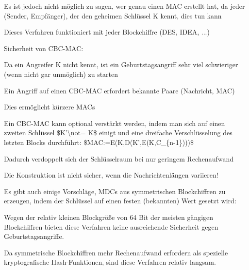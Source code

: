 \documentclass[a4paper]{article}
\begin{document}
\begin{multicols}{3}
\begin{itemize*}
            \begin{itemize*}
                  \item Es ist jedoch nicht möglich zu sagen, wer genau einen MAC erstellt hat, da jeder (Sender, Empfänger), der den geheimen Schlüssel K kennt, dies tun kann
            \end{itemize*}
            \item
            Dieses Verfahren funktioniert mit jeder Blockchiffre (DES, IDEA, ...)
            \item
            Sicherheit von CBC-MAC:

            \begin{itemize*}
                  \item Da ein Angreifer K nicht kennt, ist ein Geburtstagsangriff sehr viel schwieriger (wenn nicht gar unmöglich) zu starten
                  \item Ein Angriff auf einen CBC-MAC erfordert bekannte Paare (Nachricht, MAC)
                  \item Dies ermöglicht kürzere MACs
                  \item Ein CBC-MAC kann optional verstärkt werden, indem man sich auf einen zweiten Schlüssel \$K'\textbackslash not= K\$ einigt und eine dreifache Verschlüsselung des letzten Blocks durchführt: \$MAC:=E(K,D(K',E(K,C\_\{n-1\})))\$
                  \item Dadurch verdoppelt sich der Schlüsselraum bei nur geringem Rechenaufwand
                  \item Die Konstruktion ist nicht sicher, wenn die Nachrichtenlängen variieren!
            \end{itemize*}
            \item
            Es gibt auch einige Vorschläge, MDCs aus symmetrischen Blockchiffren
            zu erzeugen, indem der Schlüssel auf einen festen (bekannten) Wert
            gesetzt wird:

            \begin{itemize*}
                  \item Wegen der relativ kleinen Blockgröße von 64 Bit der meisten gängigen Blockchiffren bieten diese Verfahren keine ausreichende Sicherheit gegen Geburtstagsangriffe.
                  \item Da symmetrische Blockchiffren mehr Rechenaufwand erfordern als spezielle kryptografische Hash-Funktionen, sind diese Verfahren relativ langsam.
            \end{itemize*}
      \end{itemize*}



\end{multicols}
\end{document}
